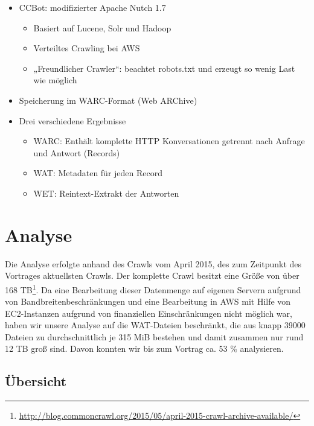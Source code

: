\documentclass[a4paper,12pt,titlepage=false]{scrreprt}
\begin{document}
\begin{itemize}
    \item CCBot: modifizierter Apache Nutch 1.7
        \begin{itemize}
            \item Basiert auf Lucene, Solr und Hadoop
            \item Verteiltes Crawling bei AWS
            \item „Freundlicher Crawler“: beachtet robots.txt und erzeugt so wenig Last wie möglich
        \end{itemize}
    \item Speicherung im WARC-Format (Web ARChive)
    \item Drei verschiedene Ergebnisse
        \begin{itemize}
            \item WARC: Enthält komplette HTTP Konversationen getrennt nach
                Anfrage und Antwort (Records)
            \item WAT: Metadaten für jeden Record
            \item WET: Reintext-Extrakt der Antworten
        \end{itemize}
\end{itemize}


\chapter{Analyse}

Die Analyse erfolgte anhand des Crawls vom April 2015, des zum Zeitpunkt des
Vortrages aktuellsten Crawls. Der komplette Crawl besitzt eine Größe von über
168 TB\footnote{\url{http://blog.commoncrawl.org/2015/05/april-2015-crawl-archive-available/}}.
Da eine Bearbeitung dieser Datenmenge auf eigenen Servern aufgrund von
Bandbreitenbeschränkungen und eine Bearbeitung in AWS mit Hilfe von EC2-Instanzen
aufgrund von finanziellen Einschränkungen nicht möglich war, haben wir unsere
Analyse auf die WAT-Dateien beschränkt, die aus knapp 39000 Dateien zu
durchschnittlich je 315 MiB bestehen und damit zusammen nur rund 12 TB groß sind.
Davon konnten wir bis zum Vortrag ca. 53 \% analysieren.

\section{Übersicht}

\begin{figure}
\label{wrap-fig:1}
\end{figure}
\end{document}
